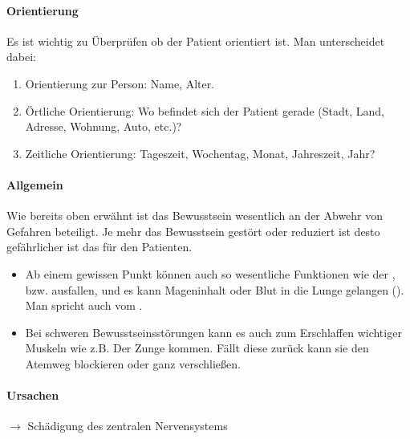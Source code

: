 
\paragraph{Orientierung}

Es ist wichtig zu Überprüfen ob der Patient orientiert ist.
Man unterscheidet dabei: 

\begin{enumerate}
    \item Orientierung zur Person: Name, Alter.
    \item Örtliche Orientierung: Wo befindet sich der Patient gerade
    (Stadt, Land, Adresse, Wohnung, Auto, etc.)?
    \item Zeitliche Orientierung: Tageszeit, Wochentag, Monat, Jahreszeit,
    Jahr?
\end{enumerate}

\paragraph{Allgemein}

Wie bereits oben erwähnt ist das Bewusstsein wesentlich an der Abwehr
von Gefahren beteiligt. Je mehr das Bewusstsein gestört oder
reduziert ist desto gefährlicher ist das für den Patienten. 

\begin{itemize}
    \item Ab einem gewissen Punkt können auch so wesentliche
    Funktionen wie der ,  bzw. 
    ausfallen, und es kann Mageninhalt oder Blut in die
    Lunge gelangen (). Man spricht auch vom
    .
    \item Bei schweren Bewusstseinsstörungen kann es auch zum Erschlaffen
    wichtiger Muskeln wie z.B. Der Zunge kommen. Fällt diese zurück
    kann sie den Atemweg blockieren oder ganz verschließen.
\end{itemize}


\paragraph{Ursachen}

${\rightarrow}$ Schädigung des zentralen Nervensystems

